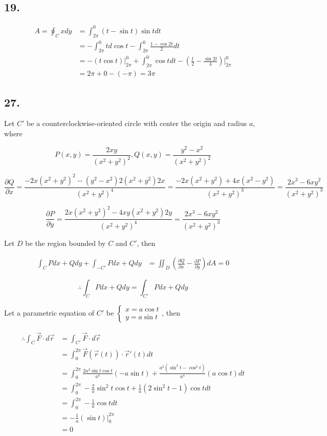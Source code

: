 \documentclass{article}
\begin{document}
  \subsection*{19. }

  $$\begin{aligned}
    A = \oint_C x dy &= \int_{2\pi}^{0} (t-\sin t)\sin t dt \\
    &= -\int_{2\pi}^0 t d\cos t - \int_{2\pi}^0 \frac{1 - \cos 2t}{2} dt \\
    &= -(t\cos t)\biggl|_{2\pi}^0 + \int_{2\pi}^0 \cos t dt - (\frac{t}{2} - \frac{\sin 2t}{4})\biggl|_{2\pi}^0 \\
    &= 2\pi + 0 - (-\pi) = 3\pi
  \end{aligned}$$

  \subsection*{27. }

  Let $C'$ be a counterclockwise-oriented circle with center the origin and radius $a$, where

  $$P(x, y) = \frac{2xy}{(x^2+y^2)^2}, Q(x, y) = \frac{y^2-x^2}{(x^2+y^2)^2}$$

  $$\frac{\partial Q}{\partial x} = \frac{-2x(x^2+y^2)^2 - (y^2-x^2)2(x^2+y^2)2x}{(x^2+y^2)^4} = \frac{-2x(x^2+y^2) + 4x(x^2-y^2)}{(x^2+y^2)^3} = \frac{2x^3-6xy^2}{(x^2+y^2)^3}$$

  $$\frac{\partial P}{\partial y} = \frac{2x(x^2+y^2)^2 - 4xy(x^2+y^2) 2y}{(x^2+y^2)^4} = \frac{2x^3 - 6xy^2}{(x^2+y^2)^3}$$

  Let $D$ be the region bounded by $C$ and $C'$, then

  $$\begin{aligned}
    \int_C Pdx + Qdy + \int_{-C'} Pdx + Qdy &= \iint_D (\frac{\partial Q}{\partial x} - \frac{\partial P}{\partial y})dA = 0
  \end{aligned}$$

  $$\therefore \int_C Pdx + Qdy = \int_{C'} Pdx + Qdy$$

  Let a parametric equation of $C'$ be $\left\{ \begin{array}{ll} x = a \cos t \\ y = a \sin t \end{array}\right.$, then

  $$\begin{aligned}
    \therefore \int_C \overrightarrow{F} \cdot d\overrightarrow{r} &= \int_{C'}\overrightarrow{F} \cdot d\overrightarrow{r} \\
    &= \int_0^{2\pi} \overrightarrow{F}(\overrightarrow{r}(t)) \cdot \overrightarrow{r}'(t) dt \\
    &= \int_0^{2\pi} \frac{2a^2 \sin t \cos t}{a^4}(-a\sin t) + \frac{a^2(\sin^2 t - \cos^2 t)}{a^4}(a\cos t) dt \\
    &= \int_0^{2\pi} -\frac{2}{a} \sin^2 t \cos t + \frac{1}{a}(2\sin^2 t - 1) \cos t dt \\
    &= \int_0^{2\pi} -\frac 1 a \cos t dt \\
    &= -\frac 1 a (\sin t)\biggl|_0^{2\pi} \\
    &= 0
  \end{aligned}$$
\end{document}
